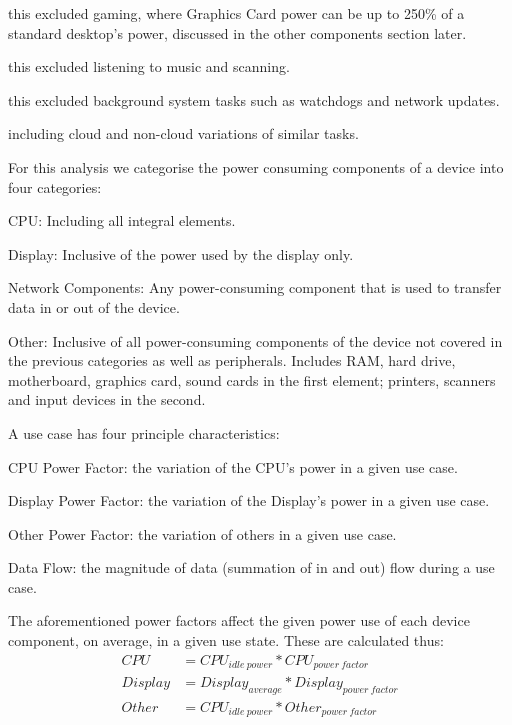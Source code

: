 \documentclass[conference]{IEEEtran}
\begin{document}
 this excluded gaming, where Graphics Card power
can be up to 250\% of a standard desktop’s power, discussed in the
other components section later.

 this
excluded listening to music and scanning.

 this excluded background system tasks such as
watchdogs and network updates.

 including cloud
and non-cloud variations of similar tasks.

For this analysis we categorise the power consuming components of
a device into four categories:

\begin{compactitem}
\item CPU: Including all integral elements.
\item Display: Inclusive of the power used by the display only.
\item Network Components: Any power-consuming component that is used to transfer data in or out of the device.
\item Other: Inclusive of all power-consuming components
  of the device not covered in the previous categories as well as
  peripherals. Includes RAM, hard drive, motherboard, graphics
  card, sound cards in the first element; printers, scanners and input
  devices in the second.
\end{compactitem}

A use case has four principle characteristics:

\begin{compactitem}
\item CPU Power Factor: the variation of the CPU’s power in a given use case.
\item Display Power Factor: the variation of the Display’s power in a given use case.
\item Other Power Factor: the variation of others in a given use case.
\item Data Flow: the magnitude of data (summation of in and out) flow during a use case.
\end{compactitem}

The aforementioned power factors affect the given power use of each
device component, on average, in a given use state. These are
calculated thus:
\begin{align*}
CPU &= CPU_{idle\ power} * CPU_{power\ factor}\\
Display &= Display_{average} * Display_{power\ factor}\\
Other &= CPU_{idle\ power} * Other_{power\ factor}
\end{align*}
\end{document}

